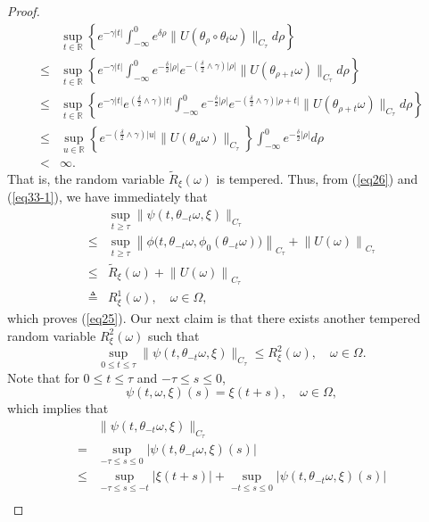 \documentclass[preprint,12pt]{elsarticle}
\begin{document}
\begin{proof}
\begin{align}
&\sup_{t\in\mathbb{R}}\left\{e^{-\gamma|t|}\int_{-\infty}^0e^{\delta\rho}\|U(\theta_{\rho}\circ\theta_t\omega)\|_{C_\tau}d\rho\right\}\nonumber\\
\leq&\sup_{t\in\mathbb{R}}\left\{e^{-\gamma|t|}\int_{-\infty}^0 e^{-\frac\delta2|\rho|}e^{-(\frac\delta2\wedge\gamma)|\rho|}\|U(\theta_{\rho+t}\omega)\|_{C_\tau}d\rho\right\}\nonumber\\
\leq&\sup_{t\in\mathbb{R}}\left\{e^{-\gamma|t|}e^{(\frac\delta2\wedge\gamma)|t|}\int_{-\infty}^0 e^{-\frac\delta2|\rho|}e^{-(\frac\delta2\wedge\gamma)|\rho+t|}\|U(\theta_{\rho+t}\omega)\|_{C_\tau}d\rho\right\}\nonumber\\
\leq&\sup_{u\in\mathbb{R}}\left\{e^{-(\frac\delta2\wedge\gamma)|u|}\|U(\theta_{u}\omega)\|_{C_\tau}\right\}\int_{-\infty}^0 e^{-\frac\delta2|\rho|}d\rho\nonumber\\
<&\infty.
\end{align}
That is, the random variable $\widetilde{R}_\xi(\omega)$ is tempered.  Thus, from (\ref{eq26}) and (\ref{eq33-1}), we have immediately that
\begin{align}\label{eq38}
&\sup_{t\geq\tau}\|\psi(t,\theta_{-t}\omega,\xi)\|_{C_\tau}\nonumber\\
\leq&\sup_{t\geq\tau}\left\|\phi\bigl(t,\theta_{-t}\omega,\phi_0(\theta_{-t}\omega)\bigr)\right\|_{C_\tau}+\left\|U(\omega)\right\|_{C_\tau}\nonumber\\
\leq&\widetilde{R}_\xi(\omega)+\left\|U(\omega)\right\|_{C_\tau}\nonumber\\
\triangleq&R_\xi^1(\omega),\quad\omega\in\Omega,
\end{align}
which proves (\ref{eq25}). Our next claim is that there exists another tempered random variable $R_\xi^2(\omega)$ such that
\begin{equation}\label{eq39}
\sup_{0\leq t\leq\tau}\|\psi(t,\theta_{-t}\omega,\xi)\|_{C_\tau}\leq R_\xi^2(\omega),\quad\omega\in\Omega.
\end{equation}
Note that for $0\leq t\leq\tau$ and $-\tau\leq s\leq0$,
\begin{equation}\label{eq40}
\psi(t,\omega,\xi)(s)=\xi(t+s),\quad\omega\in\Omega,
\end{equation}
which implies that
\begin{align}\label{eq41-1}
&\|\psi(t,\theta_{-t}\omega,\xi)\|_{C_\tau}\nonumber\\
=&\sup_{-\tau\leq s\leq0}|\psi(t,\theta_{-t}\omega,\xi)(s)|\nonumber\\
\leq&\sup_{-\tau\leq s\leq-t}|\xi(t+s)|+\sup_{-t\leq s\leq0}|\psi(t,\theta_{-t}\omega,\xi)(s)|\nonumber\\

\end{align}
\end{proof}
\end{document}
